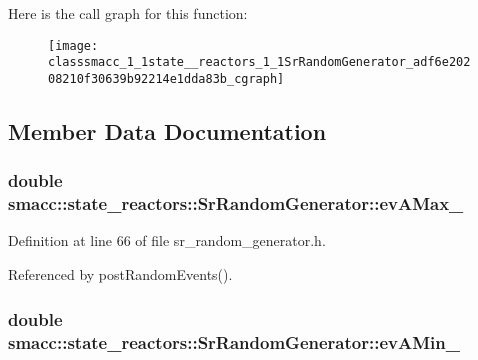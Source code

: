 Here is the call graph for this function\+:
\nopagebreak
\begin{figure}[H]
\begin{center}
\leavevmode
\texttt{[image: classsmacc\_1\_1state\_\_reactors\_1\_1SrRandomGenerator\_adf6e20208210f30639b92214e1dda83b\_cgraph]}
\end{center}
\end{figure}




\subsection{Member Data Documentation}
\subsubsection[{\texorpdfstring{ev\+A\+Max\+\_\+}{evAMax_}}]{\setlength{\rightskip}{0pt plus 5cm}double smacc\+::state\+\_\+reactors\+::\+Sr\+Random\+Generator\+::ev\+A\+Max\+\_\+\hspace{0.3cm}{\ttfamily [private]}}\hypertarget{classsmacc_1_1state__reactors_1_1SrRandomGenerator_ad5148909923e6761c7de33749f324609}{}\label{classsmacc_1_1state__reactors_1_1SrRandomGenerator_ad5148909923e6761c7de33749f324609}


Definition at line 66 of file sr\+\_\+random\+\_\+generator.\+h.



Referenced by post\+Random\+Events().

\subsubsection[{\texorpdfstring{ev\+A\+Min\+\_\+}{evAMin_}}]{\setlength{\rightskip}{0pt plus 5cm}double smacc\+::state\+\_\+reactors\+::\+Sr\+Random\+Generator\+::ev\+A\+Min\+\_\+\hspace{0.3cm}{\ttfamily [private]}}\hypertarget{classsmacc_1_1state__reactors_1_1SrRandomGenerator_aaa18a0eec1d0777ea1607b5ac7491495}{}\label{classsmacc_1_1state__reactors_1_1SrRandomGenerator_aaa18a0eec1d0777ea1607b5ac7491495}


